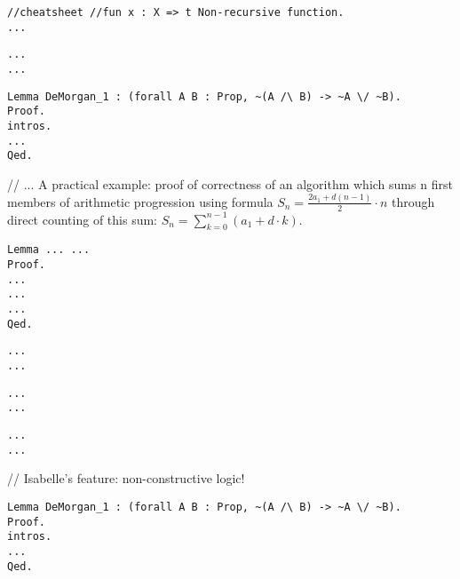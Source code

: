 \documentclass[article]{aaltoseries}
\begin{document}
\begin{lstlisting}[caption={Non-recursive function definition: factorial}]
//cheatsheet //fun x : X => t Non-recursive function.
...
\end{lstlisting}

\begin{lstlisting}[caption={Inductive data type definition: ???}]
...
...
\end{lstlisting}

	\begin{lstlisting}[caption={Propositional logic proof: de Morgan's law}]
Lemma DeMorgan_1 : (forall A B : Prop, ~(A /\ B) -> ~A \/ ~B).
Proof.
intros.
...
Qed.
\end{lstlisting}

// ... A practical example: proof of correctness of an algorithm which sums n first members of arithmetic progression using formula $S_{n} = { {\frac {2 a_{1} + d (n - 1)}{2} \cdot n}}$ through direct counting of this sum: $S_{n} = \sum\limits_{k=0}^{n-1} (a_{1} + d \cdot k)$.
\begin{lstlisting}[caption={First-order logic proof: formula of the sum of n first members of arithmetic progression}]
Lemma ... ... 
Proof.
...
...
...
Qed.
\end{lstlisting}



\begin{lstlisting}[caption={Recursive function definition: factorial}]
...
...
\end{lstlisting}

\begin{lstlisting}[caption={Non-recursive function definition: factorial}]
...
...
\end{lstlisting}

\begin{lstlisting}[caption={Inductive data type definition: list}]
...
...
\end{lstlisting}

// Isabelle's feature: non-constructive logic!
\begin{lstlisting}[caption={Propositional logic proof to the contrary}]
Lemma DeMorgan_1 : (forall A B : Prop, ~(A /\ B) -> ~A \/ ~B).
Proof.
intros.
...
Qed.
\end{lstlisting}
\end{document}
